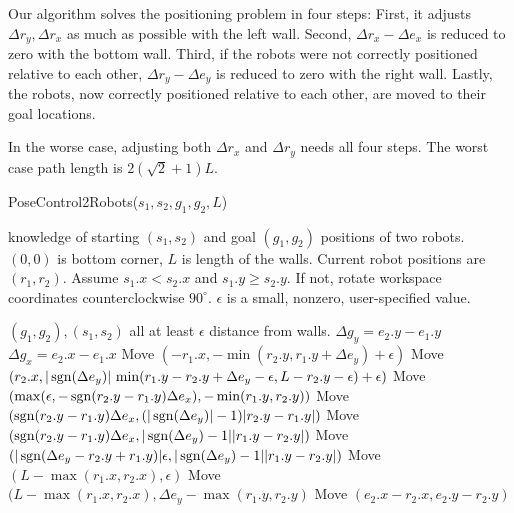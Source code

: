 Our algorithm solves the positioning problem in four steps: 
First, it adjusts $\Delta r_y , \Delta r_x$ as much as possible with the left wall.
Second, $\Delta r_x -\Delta e_x$ is reduced to zero with the bottom wall.
Third, if the robots were not correctly positioned relative to each other, $\Delta r_y -\Delta e_y$ is reduced to zero with the right wall.
Lastly, the robots, now correctly positioned relative to each other, are moved to their goal locations.

In the worse case, adjusting both $\Delta r_x$ and $\Delta r_y$ needs all four steps. The worst case path length is $2(\sqrt{2}+1)L$.





\begin{algorithm}
\caption{PoseControl2Robots($s_1,s_2,g_1,g_2,L$)}\label{alg:PosControl2Robots}
\begin{algorithmic}[1]
\scriptsize
\Require knowledge of starting $(s_1,s_2)$ and goal $(g_1,g_2)$ positions of  two robots. 
$(0,0)$ is bottom corner,
 $L$ is length of the walls. Current robot positions are $(r_1,r_2)$.
 Assume $s_1.x < s_2.x$ and $s_1.y \geq s_2.y$. If not, rotate workspace coordinates counterclockwise $90^{\circ}$.
$\epsilon $ is a small, nonzero, user-specified value.
 
\Ensure $(g_1, g_2) , (s_1, s_2)$ all at least $\epsilon$ distance from walls.
\State $\Delta g_y = e_2.y - e_1.y$
\State $\Delta g_x = e_2.x - e_1.x$
\State Move $\left(-r_1.x , -\min \left(r_2.y , r_1.y+ \Delta e_y \right)+\epsilon \right)$ 
\State Move $ (r_2.x, |\operatorname{sgn}(\Delta e_y)| \, \min(r_1.y - r_2.y + \Delta e_y-\epsilon,L-r_2.y-\epsilon)+ \epsilon)$
\Statex {}
\State Move $(\max(\epsilon, -\operatorname{sgn}(r_2.y - r_1.y)\Delta e_x), -\min(r_1.y , r_2.y))$ 
\Statex {}
\State Move $(\operatorname{sgn}(r_2.y - r_1.y)\Delta e_x , (|\operatorname{sgn}(\Delta e_y)|-1) |r_2.y - r_1.y|)$ 
\State Move $(\operatorname{sgn}(r_2.y- r_1.y)\Delta e_x, |\operatorname{sgn}(\Delta e_y)-1| |r_1.y-r_2.y|)$ 
\Else
\State Move  $(|\operatorname{sgn}(\Delta e_y -r_2.y+ r_1.y)| \epsilon, |\operatorname{sgn}(\Delta e_y)-1| |r_1.y-r_2.y|)$ 
\EndIf
\State Move $(L - \max(r_1.x, r_2.x), \epsilon)$
\Else 
\State Move $(L - \max(r_1.x, r_2.x),\Delta e_y -\max(r_1.y, r_2.y)$ 
\Statex {}
\EndIf
\EndIf
\State Move $(e_2.x - r_2.x, e_2.y - r_2.y)$ 
\end{algorithmic}
\end{algorithm}






